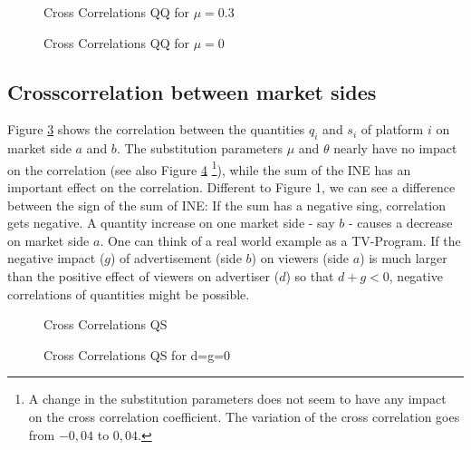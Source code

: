 \documentclass[10pt,a4paper]{article}
\begin{document}
\begin{figure}[H]
	\centering
	\setlength\figureheight{8cm} 
	\setlength\figurewidth{8cm}
	
	\caption{Cross Correlations QQ for $\mu=0.3$}
	\label{QQ2}
\end{figure}

\begin{figure}[H]
	\centering
	\setlength\figureheight{8cm} 
	\setlength\figurewidth{8cm}
	
	\caption{Cross Correlations QQ for $\mu=0$}
	\label{QQ2}
\end{figure}



\subsection{Crosscorrelation between market sides}

Figure \ref{QS} shows the correlation between the quantities $q_i$ and $s_i$ of platform $i$ on market side $a$ and $b$. The substitution parameters $\mu$ and $\theta$ nearly have no impact on the correlation (see also Figure \ref{QS2} \footnote{A change in the substitution parameters does not seem to have any impact on the cross correlation coefficient. The variation of the cross correlation goes from $-0,04$ to $0,04$.}), while the sum of the INE has an important effect on the correlation. Different to Figure 1, we can see a difference between the sign of the sum of INE: If the sum has a negative sing, correlation gets negative. A quantity increase on one market side - say $b$ - causes a decrease on market side $a$. One can think of a real world example as a TV-Program. If the negative impact ($g$) of advertisement (side $b$) on viewers (side $a$) is much larger than the positive effect of viewers on advertiser ($d$) so that $d+g < 0$, negative correlations of quantities might be possible. 

\begin{figure}[H]
	\centering
	\setlength\figureheight{8cm} 
	\setlength\figurewidth{10cm}
	
	\caption{Cross Correlations QS}
	\label{QS}
\end{figure}

\begin{figure}[H]
	\centering
	\setlength\figureheight{8cm} 
	\setlength\figurewidth{8cm}
	
	\caption{Cross Correlations QS for d=g=0}
	\label{QS2}
\end{figure}
\end{document}
